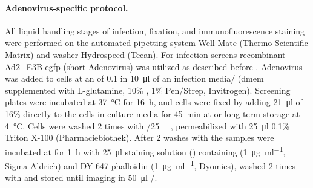 \paragraph{Adenovirus-specific protocol.}
All liquid handling stages of infection, fixation, and immunofluorescence staining were performed on the automated pipetting system Well Mate (Thermo Scientific Matrix) and washer Hydrospeed (Tecan). For infection screens recombinant Ad2\_\textDelta E3B-e\acrshort{gfp} (short Adenovirus) was utilized as described before \citep{Suomalainen2013,Yakimovich2012}. Adenovirus was added to cells at an  of 0.1 in \SI{10}{\micro\litre} of an infection media\slash {} (\acrshort{dmem} supplemented with L-glutamine, 10\% , 1\% Pen\slash Strep, Invitrogen). Screening plates were incubated at \SI{37}{\celsius} for \SI{16}{\hour}, and cells were fixed by adding \SI{21}{\micro\litre} of 16\%  directly to the cells in culture media for \SI{45}{\minute} at  or long-term storage at \SI{4}{\celsius}. Cells were washed 2 times with \slash \SI{25}{\milli\Molar} , permeabilized with \SI{25}{\micro\litre} 0.1\% Triton X-100 (Pharmaciebiothek). After 2 washes with  the samples were incubated at  for \SI{1}{\hour} with \SI{25}{\micro\litre} staining solution () containing  (\SI{1}{\micro\gram\per\milli\litre}, Sigma-Aldrich) and DY-647-phalloidin (\SI{1}{\micro\gram\per\milli\litre}, Dyomics), washed 2 times with  and stored until imaging in \SI{50}{\micro\litre} \slash {}.

